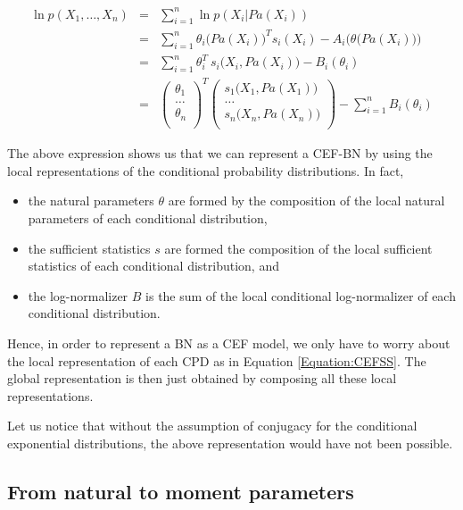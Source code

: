 \documentclass[11pt, oneside]{article}   	%
\numberwithin{figure}{section}
\numberwithin{equation}{section}
\numberwithin{table}{section}
\theoremstyle{definition}
\begin{document}
\begin{eqnarray}
\label{Equation:CEFSS}
\ln p(X_1,\ldots, X_n) &=& \sum_{i=1}^n \ln p(X_i|Pa(X_i))\nonumber\\
&=& \sum_{i=1}^n \theta_i \big(Pa(X_i)\big)^T s_i(X_i) - A_i\Big(\theta\big(Pa(X_i)\big)\Big)\nonumber\\
&=& \sum_{i=1}^n \theta_i^T~s_i\big(X_i, Pa(X_i)\big) - B_i(\theta_i)\nonumber\\
&=&
\begin{pmatrix}
\theta_1\\
\ldots \\
\theta_n\\
\end{pmatrix}^T
\begin{pmatrix}
s_1\big(X_1,Pa(X_1)\big) \\
\ldots \\
s_n\big(X_n,Pa(X_n)\big) \\
\end{pmatrix}
- \sum_{i=1}^n B_i(\theta_i)
\end{eqnarray}

The above expression shows us that we can represent a CEF-BN by using the local representations of the conditional probability distributions. In fact, 

\begin{itemize}
\item the natural parameters $\theta$ are formed by the composition of the local natural parameters of each conditional distribution, 
\item the sufficient statistics $s$ are formed the composition of the local sufficient statistics of each conditional distribution, and 
\item the log-normalizer $B$ is the sum of the local conditional log-normalizer of each conditional distribution. 
\end{itemize}

Hence, in order to represent a BN as a CEF model, we only have to worry about the local representation of each CPD as in Equation \ref{Equation:CEFSS}. The global representation is then just obtained by composing all these local representations. 

Let us notice that without the assumption of conjugacy  for the conditional exponential distributions, the above representation would have not been possible. 

\subsection{From natural to moment parameters} \label{Section:CEFBN:NaturalToMoment}
\end{document}
